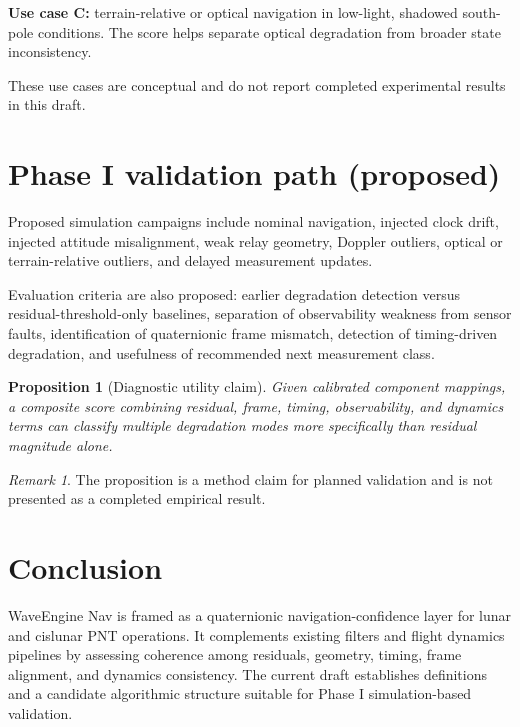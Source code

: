 \documentclass[11pt]{article}
\newtheorem{proposition}[definition]{Proposition}
\theoremstyle{remark}
\newtheorem{remark}[definition]{Remark}
\begin{document}
\textbf{Use case C:} terrain-relative or optical navigation in low-light, shadowed south-pole conditions. The score helps separate optical degradation from broader state inconsistency.

These use cases are conceptual and do not report completed experimental results in this draft.

\section{Phase I validation path (proposed)}

Proposed simulation campaigns include nominal navigation, injected clock drift, injected attitude misalignment, weak relay geometry, Doppler outliers, optical or terrain-relative outliers, and delayed measurement updates.

Evaluation criteria are also proposed: earlier degradation detection versus residual-threshold-only baselines, separation of observability weakness from sensor faults, identification of quaternionic frame mismatch, detection of timing-driven degradation, and usefulness of recommended next measurement class.

\begin{proposition}[Diagnostic utility claim]
Given calibrated component mappings, a composite score combining residual, frame, timing, observability, and dynamics terms can classify multiple degradation modes more specifically than residual magnitude alone.
\end{proposition}

\begin{remark}
The proposition is a method claim for planned validation and is not presented as a completed empirical result.
\end{remark}

\section{Conclusion}

WaveEngine Nav is framed as a quaternionic navigation-confidence layer for lunar and cislunar PNT operations. It complements existing filters and flight dynamics pipelines by assessing coherence among residuals, geometry, timing, frame alignment, and dynamics consistency. The current draft establishes definitions and a candidate algorithmic structure suitable for Phase I simulation-based validation.



\end{document}
